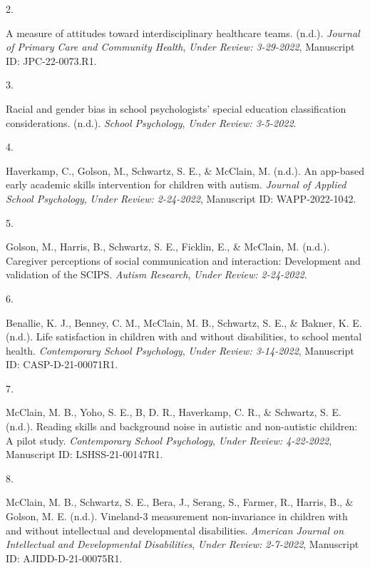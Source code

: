 \documentclass[11pt,a4paper,]{moderncv}
\newlength{\csllabelwidth}
\newcommand{\CSLLeftMargin}[1]{\parbox[t]{\csllabelwidth}{#1}}
\newcommand{\CSLRightInline}[1]{\parbox[t]{\linewidth - \csllabelwidth}{#1}}
\begin{document}
\leavevmode{}%
\CSLLeftMargin{2. }
\CSLRightInline{A measure of attitudes toward interdisciplinary
healthcare teams. (n.d.). \emph{Journal of Primary Care and Community
Health}, \emph{Under Review: 3-29-2022}, Manuscript ID: JPC-22-0073.R1.}

\leavevmode{}%
\CSLLeftMargin{3. }
\CSLRightInline{Racial and gender bias in school psychologists' special
education classification considerations. (n.d.). \emph{School
Psychology}, \emph{Under Review: 3-5-2022}.}

\leavevmode{}%
\CSLLeftMargin{4. }
\CSLRightInline{Haverkamp, C., Golson, M., Schwartz, S. E., \& McClain,
M. (n.d.). An app-based early academic skills intervention for children
with autism. \emph{Journal of Applied School Psychology}, \emph{Under
Review: 2-24-2022}, Manuscript ID: WAPP-2022-1042.}

\leavevmode{}%
\CSLLeftMargin{5. }
\CSLRightInline{Golson, M., Harris, B., Schwartz, S. E., Ficklin, E., \&
McClain, M. (n.d.). Caregiver perceptions of social communication and
interaction: Development and validation of the SCIPS. \emph{Autism
Research}, \emph{Under Review: 2-24-2022}.}

\leavevmode{}%
\CSLLeftMargin{6. }
\CSLRightInline{Benallie, K. J., Benney, C. M., McClain, M. B.,
Schwartz, S. E., \& Bakner, K. E. (n.d.). Life satisfaction in children
with and without disabilities, to school mental health.
\emph{Contemporary School Psychology}, \emph{Under Review: 3-14-2022},
Manuscript ID: CASP-D-21-00071R1.}

\leavevmode{}%
\CSLLeftMargin{7. }
\CSLRightInline{McClain, M. B., Yoho, S. E., B, D. R., Haverkamp, C. R.,
\& Schwartz, S. E. (n.d.). Reading skills and background noise in
autistic and non-autistic children: A pilot study. \emph{Contemporary
School Psychology}, \emph{Under Review: 4-22-2022}, Manuscript ID:
LSHSS-21-00147R1.}

\leavevmode{}%
\CSLLeftMargin{8. }
\CSLRightInline{McClain, M. B., Schwartz, S. E., Bera, J., Serang, S.,
Farmer, R., Harris, B., \& Golson, M. E. (n.d.). Vineland-3 measurement
non-invariance in children with and without intellectual and
developmental disabilities. \emph{American Journal on Intellectual and
Developmental Disabilities}, \emph{Under Review: 2-7-2022}, Manuscript
ID: AJIDD-D-21-00075R1.}
\end{document}

